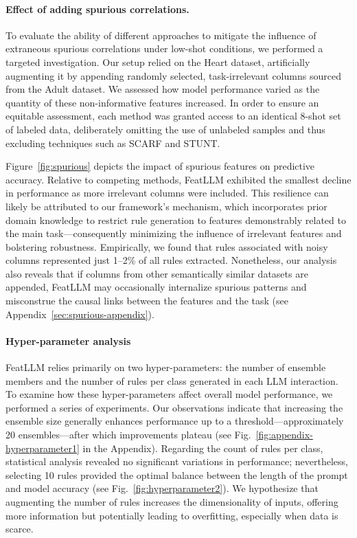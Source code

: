 \paragraph{Effect of adding spurious correlations.} To evaluate the ability of different approaches to mitigate the influence of extraneous spurious correlations under low-shot conditions, we performed a targeted investigation. Our setup relied on the Heart dataset, artificially augmenting it by appending randomly selected, task-irrelevant columns sourced from the Adult dataset. We assessed how model performance varied as the quantity of these non-informative features increased. In order to ensure an equitable assessment, each method was granted access to an identical 8-shot set of labeled data, deliberately omitting the use of unlabeled samples and thus excluding techniques such as SCARF and STUNT.

Figure~\ref{fig:spurious} depicts the impact of spurious features on predictive accuracy. Relative to competing methods, \textsf{FeatLLM} exhibited the smallest decline in performance as more irrelevant columns were included. This resilience can likely be attributed to our framework’s mechanism, which incorporates prior domain knowledge to restrict rule generation to features demonstrably related to the main task—consequently minimizing the influence of irrelevant features and bolstering robustness. Empirically, we found that rules associated with noisy columns represented just 1–2\% of all rules extracted. Nonetheless, our analysis also reveals that if columns from other semantically similar datasets are appended, \textsf{FeatLLM} may occasionally internalize spurious patterns and misconstrue the causal links between the features and the task (see Appendix~\ref{sec:spurious-appendix}).

\vspace*{-0.12in}
\paragraph{Hyper-parameter analysis}
\textsf{FeatLLM} relies primarily on two hyper-parameters: the number of ensemble members and the number of rules per class generated in each LLM interaction. To examine how these hyper-parameters affect overall model performance, we performed a series of experiments. Our observations indicate that increasing the ensemble size generally enhances performance up to a threshold—approximately 20 ensembles—after which improvements plateau (see Fig.~\ref{fig:appendix-hyperparameter1} in the Appendix). Regarding the count of rules per class, statistical analysis revealed no significant variations in performance; nevertheless, selecting 10 rules provided the optimal balance between the length of the prompt and model accuracy (see Fig.~\ref{fig:hyperparameter2}). We hypothesize that augmenting the number of rules increases the dimensionality of inputs, offering more information but potentially leading to overfitting, especially when data is scarce.

